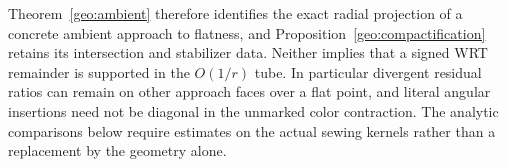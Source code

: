 Theorem~\ref{geo:ambient} therefore identifies the exact radial projection of a concrete ambient approach to flatness, and Proposition~\ref{geo:compactification} retains its intersection and stabilizer data. Neither implies that a signed WRT remainder is supported in the \(O(1/r)\) tube. In particular divergent residual ratios can remain on other approach faces over a flat point, and literal angular insertions need not be diagonal in the unmarked color contraction. The analytic comparisons below require estimates on the actual sewing kernels rather than a replacement by the geometry alone.
